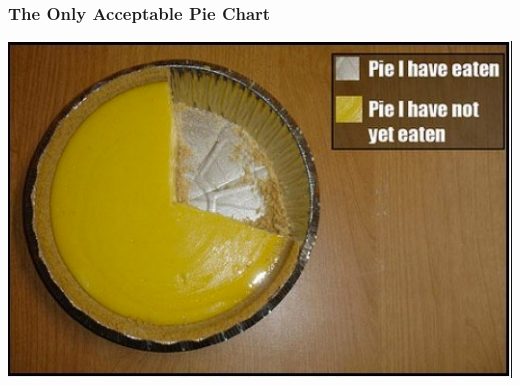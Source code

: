 \documentclass{beamer} %
\begin{document}
\begin{frame}\frametitle{The Only Acceptable Pie Chart}
	\centering
	\includegraphics[width=\linewidth]{pieseaten.png}
\end{frame}
\end{document}
